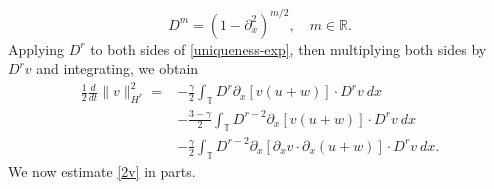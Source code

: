 \documentclass[12pt,reqno]{amsart}
\numberwithin{equation}{section}  %
\numberwithin{figure}{section}
\newcommand{\rr}{\mathbb{R}}
\newcommand{\ci}{\mathbb{T}}
\newcommand{\p}{\partial}
\begin{document}
\begin{equation*}
	D^{m} = (1 - \p_x^2)^{m/2}, \quad m \in \rr.
\end{equation*}
%
Applying $D^r$ to both sides of \eqref{uniqueness-exp}, then 
multiplying both sides by $D^r v$ and integrating, we obtain
%
%
\begin{equation}
\begin{split}
 \frac{1}{2} \frac{d}{dt} \|v\|_{H^r}^2
 = & -\frac{\gamma}{2} \int_{\ci} D^r \p_x [v(u+w)] \cdot
D^r v \ dx
\\
& - \frac{3-\gamma}{2} \int_{\ci}  D^{r -2}
\p_x[v(u+w)] \cdot
D^r v \ dx  
\\
& - \frac{\gamma}{2} \int_{\ci} D^{r 
-2} \p_x [ \p_x v
\cdot \p_x (u+w)]\cdot D^r v \ dx.
\label{2v}
\end{split}
\end{equation}
%
%
We now estimate \eqref{2v} in parts.
\end{document}
